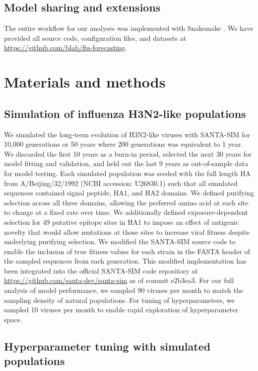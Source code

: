 \subsection*{Model sharing and extensions}

The entire workflow for our analyses was implemented with Snakemake \cite{Snakemake}.
We have provided all source code, configuration files, and datasets at \href{https://github.com/blab/flu-forecasting}{https://github.com/blab/flu-forecasting}.

\section*{Materials and methods}

\subsection*{Simulation of influenza H3N2-like populations}

We simulated the long-term evolution of H3N2-like viruses with SANTA-SIM \cite{Jariani2019} for 10,000 generations or 50 years where 200 generations was equivalent to 1 year.
We discarded the first 10 years as a burn-in period, selected the next 30 years for model fitting and validation, and held out the last 9 years as out-of-sample data for model testing.
Each simulated population was seeded with the full length HA from A/Beijing/32/1992 (NCBI accession: U26830.1) such that all simulated sequences contained signal peptide, HA1, and HA2 domains.
We defined purifying selection across all three domains, allowing the preferred amino acid at each site to change at a fixed rate over time.
We additionally defined exposure-dependent selection for 49 putative epitope sites in HA1 \cite{Luksza:2014hj} to impose an effect of antigenic novelty that would allow mutations at those sites to increase viral fitness despite underlying purifying selection.
We modified the SANTA-SIM source code to enable the inclusion of true fitness values for each strain in the FASTA header of the sampled sequences from each generation.
This modified implementation has been integrated into the official SANTA-SIM code repository at \url{https://github.com/santa-dev/santa-sim} as of commit e2b3ea3.
For our full analysis of model performance, we sampled 90 viruses per month to match the sampling density of natural populations.
For tuning of hyperparameters, we sampled 10 viruses per month to enable rapid exploration of hyperparameter space.

\subsection*{Hyperparameter tuning with simulated populations}

